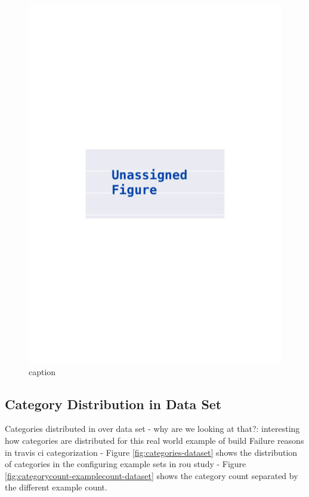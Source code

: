 \documentclass[\myrootdir/main.tex]{subfiles}
\begin{document}
\begin{figure}[htbp]
\begin{minipage}{0.45\textwidth}
		\includegraphics[width=\textwidth, clip]{img/big-study/xxx.pdf}
		\caption{caption}
		\label{fig:xxx}
	\end{minipage}
\end{figure}
\subsection{Category Distribution in Data Set}
Categories distributed in over data set
- why are we looking at that?: interesting how categories are distributed for this real world example of build Failure reasons in travis ci categorization
- Figure \ref{fig:categories-dataset} shows the distribution of categories in the configuring example sets in rou study
- Figure \ref{fig:categorycount-examplecount-dataset} shows the category count separated by the different example count.
\end{document}
